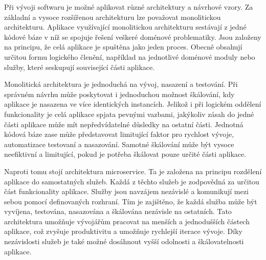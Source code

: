 

Při vývoji softwaru je možné aplikovat různé architektury a návrhové vzory. Za základní a vysoce rozšířenou architekturu lze považovat monolitickou architekturu. Aplikace využívající monolitickou architekturu sestávají z jedné kódové báze v níž se spojuje řešení veškeré doménové problematiky. \cite{Williams2023} Jsou založeny na principu, že celá aplikace je spuštěna jako jeden proces. Obecně obsahují určitou formu logického členění, například na jednotlivé doménové moduly nebo služby, které seskupují související části aplikace. \cite{Williams2023} 


Monolitická architektura je jednoduchá na vývoj, nasazení a testování. Při správném návrhu může poskytovat i jednoduchou možnost škálování, kdy aplikace je nasazena ve více identických instancích. \cite{Richardson2018} Jelikož i při logickém oddělení funkcionality je celá aplikace spjata pevnými vazbami, jakýkoliv zásah do jedné části aplikace může mít nepředvídatelné důsledky na ostatní části. Jednotná kódová báze zase může představovat limitující faktor pro rychlost vývoje, automatizace testovaní a nasazování. Samotné škálování může být vysoce neefiktivní a limitující, pokud je potřeba škálovat pouze určité části aplikace. \cite{Richardson2018}

Naproti tomu stojí architektura microservice. Ta je založena na principu rozdělení aplikace do samostatných služeb. Každá z těchto služeb je zodpovědná za určitou část funkcionality aplikace. Služby jsou navzájem nezávislé a komunikují mezi sebou pomocí definovaných rozhraní. \cite{Richardson2018} Tím je zajištěno, že každá služba může být vyvíjena, testována, nasazována a škálována nezávisle na ostatních. Tato architektura umožňuje vývojářům pracovat na menších a jednodušších částech aplikace, což zvyšuje produktivitu a umožňuje rychlejší iterace vývoje. Díky nezávislosti služeb je také možné dosáhnout vyšší odolnosti a škálovatelnosti aplikace. 



